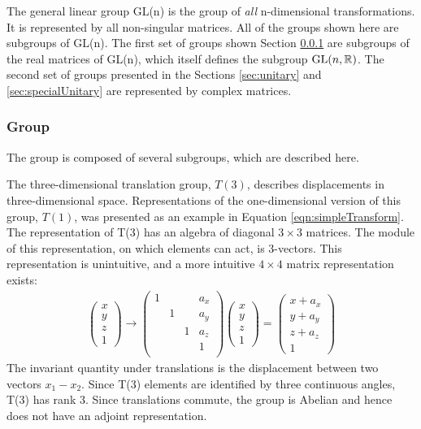 The general linear group GL(n) is the group of \emph{all} n-dimensional transformations.
It is represented by all non-singular \nxn matrices.
All of the groups shown here are subgroups of GL(n).
The first set of groups shown Section \ref{sec:poincare} are subgroups of the real \nxn matrices of GL(n), which itself defines the subgroup $\text{GL}(n,\mathbb{R})$.
The second set of groups presented in the Sections \ref{sec:unitary} and \ref{sec:specialUnitary} are represented by complex matrices.

\subsubsection{\poincare Group}\label{sec:poincare}


The \poincare group is composed of several subgroups, which are described here.

The three-dimensional translation group, $T(3)$, describes displacements in three-dimensional space.
Representations of the one-dimensional version of this group, $T(1)$, was presented as an example in Equation \ref{eqn:simpleTransform}.
The representation of T(3) has an algebra of diagonal $3\times3$ matrices. \check
The module of this representation, on which elements can act, is 3-vectors.
This representation is unintuitive, and a more intuitive $4\times4$ matrix representation exists:
\begin{equation}\begin{split}
\begin{pmatrix}
x\\y\\z\\1
\end{pmatrix}\to
\begin{pmatrix}
1& & & a_x \\
 &1& & a_y \\
 & &1& a_z \\
 & & & 1   \\
\end{pmatrix}
\begin{pmatrix}
x\\y\\z\\1
\end{pmatrix}=
\begin{pmatrix}
x+a_x\\y+a_y\\z+a_z\\1
\end{pmatrix}
\end{split}\end{equation} 
The invariant quantity under translations is the displacement between two vectors $x_1-x_2$.
Since T(3) elements are identified by three continuous angles, T(3) has rank 3.
Since translations commute, the group is Abelian and hence does not have an adjoint representation.

